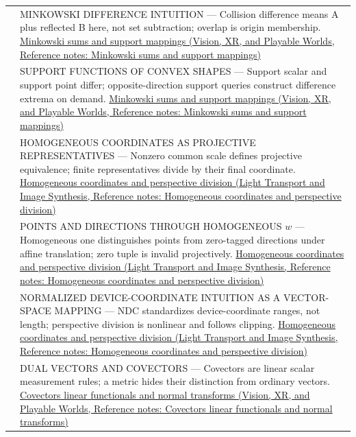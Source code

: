 {\begin{longtable}[]{@{}
  >{\raggedright\arraybackslash}p{}
  >{\raggedright\arraybackslash}p{}@{}}
576 & MINKOWSKI DIFFERENCE INTUITION --- Collision difference means A plus reflected B here, not set subtraction; overlap is origin membership. \href{../07-Vision-XR-and-Playable-Worlds/main.pdf\#nameddest=appendix-215ac7099a82}{Minkowski sums and support mappings (Vision, XR, and Playable Worlds, Reference notes: Minkowski sums and support mappings)} \\
577 & SUPPORT FUNCTIONS OF CONVEX SHAPES --- Support scalar and support point differ; opposite-direction support queries construct difference extrema on demand. \href{../07-Vision-XR-and-Playable-Worlds/main.pdf\#nameddest=appendix-215ac7099a82}{Minkowski sums and support mappings (Vision, XR, and Playable Worlds, Reference notes: Minkowski sums and support mappings)} \\
578 & HOMOGENEOUS COORDINATES AS PROJECTIVE REPRESENTATIVES --- Nonzero common scale defines projective equivalence; finite representatives divide by their final coordinate. \href{../04-Light-Transport-and-Image-Synthesis/main.pdf\#nameddest=appendix-cb3b26862282}{Homogeneous coordinates and perspective division (Light Transport and Image Synthesis, Reference notes: Homogeneous coordinates and perspective division)} \\
579 & POINTS AND DIRECTIONS THROUGH HOMOGENEOUS \(w\) --- Homogeneous one distinguishes points from zero-tagged directions under affine translation; zero tuple is invalid projectively. \href{../04-Light-Transport-and-Image-Synthesis/main.pdf\#nameddest=appendix-cb3b26862282}{Homogeneous coordinates and perspective division (Light Transport and Image Synthesis, Reference notes: Homogeneous coordinates and perspective division)} \\
580 & NORMALIZED DEVICE-COORDINATE INTUITION AS A VECTOR-SPACE MAPPING --- NDC standardizes device-coordinate ranges, not length; perspective division is nonlinear and follows clipping. \href{../04-Light-Transport-and-Image-Synthesis/main.pdf\#nameddest=appendix-cb3b26862282}{Homogeneous coordinates and perspective division (Light Transport and Image Synthesis, Reference notes: Homogeneous coordinates and perspective division)} \\
581 & DUAL VECTORS AND COVECTORS --- Covectors are linear scalar measurement rules; a metric hides their distinction from ordinary vectors. \href{../07-Vision-XR-and-Playable-Worlds/main.pdf\#nameddest=appendix-46da295c6787}{Covectors linear functionals and normal transforms (Vision, XR, and Playable Worlds, Reference notes: Covectors linear functionals and normal transforms)} \\

\end{longtable}}
